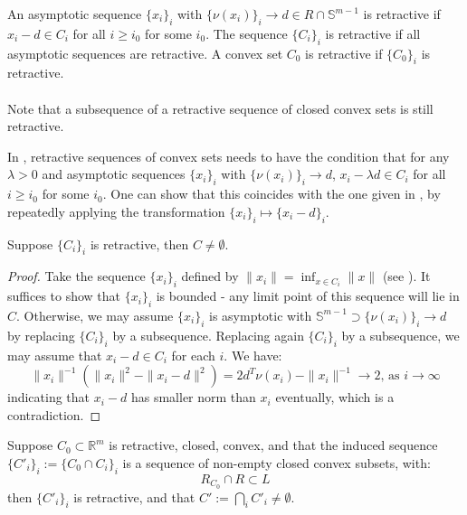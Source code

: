 \begin{defn}[Retractiveness]
	\label{defn:014-retractiveness}
	An asymptotic sequence $\{x_i\}_i$ with $\{\nu(x_i)\}_i\to d\in R\cap \mathbb{S}^{m-1}$ is retractive if $x_i-d\in C_i$ for all $i\geq i_0$ for some $i_0$. The sequence $\{C_i\}_i$ is retractive if all asymptotic sequences are retractive. A convex set $C_0$ is retractive if $\{C_0\}_i$ is retractive.
\end{defn}

\paragraph{}Note that a subsequence of a retractive sequence of closed convex sets is still retractive.

\begin{rmrk}
	In \cite{bertsekas2009convex}, retractive sequences of convex sets needs to have the condition that for any $\lambda >0$ and asymptotic sequences $\{x_i\}_i$ with $\{\nu(x_i)\}_i\to d$, $x_i-\lambda d\in C_i$ for all $i\geq i_0$ for some $i_0$. One can show that this coincides with the one given in , by repeatedly applying the transformation $\{x_i\}_i\mapsto \{x_i-d\}_i$.
\end{rmrk}

\begin{prop}
	\label{prop:014-non-empt-I}
	Suppose $\{C_i\}_i$ is retractive, then $C\neq\emptyset$.
\end{prop}

\begin{proof}
	Take the sequence $\{x_i\}_i$ defined by $\|x_i\|=\inf_{x\in C_i}\|x\|$ (see ). It suffices to show that $\{x_i\}_i$ is bounded - any limit point of this sequence will lie in $C$. Otherwise, we may assume $\{x_i\}_i$ is asymptotic with $\mathbb{S}^{m-1}\supset\{\nu(x_i)\}_i\to d$ by replacing $\{C_i\}_i$ by a subsequence. Replacing again $\{C_i\}_i$ by a subsequence, we may assume that $x_i-d\in C_i$ for each $i$. We have:
	\[
		\|x_i\|^{-1}\left(\|x_i\|^2-\|x_i-d\|^2\right)=2d^T\nu(x_i)-\|x_i\|^{-1}\to 2\text{, as }i\to\infty
	\]
	indicating that $x_i-d$ has smaller norm than $x_i$ eventually, which is a contradiction.
\end{proof}

\begin{prop}\label{prop:014-non-empt-II}
	Suppose $C_0\subset \mathbb{R}^m$ is retractive, closed, convex, and that the induced sequence $\{C'_i\}_i:=\{C_0\cap C_i\}_i$ is a sequence of non-empty closed convex subsets, with:
	\[
		R_{C_0}\cap R\subset L
	\]
	then $\{C'_i\}_i$ is retractive, and that $C':=\bigcap_iC'_i\neq\emptyset$.
\end{prop}

